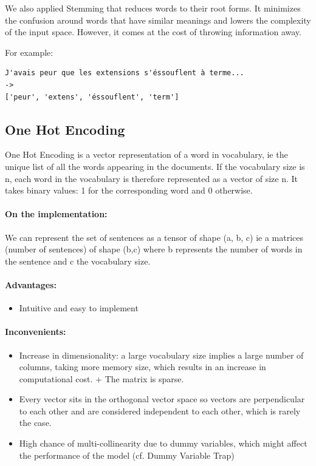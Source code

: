 \documentclass{article}
\begin{document}
We also applied Stemming that reduces words to their root forms. It minimizes the confusion around words that have similar meanings and lowers the complexity of the input space. However, it comes at the cost of throwing information away.

For example:
\begin{verbatim}
J'avais peur que les extensions s'éssouflent à terme...
->
['peur', 'extens', 'éssouflent', 'term']
\end{verbatim}

\subsection{One Hot Encoding}

One Hot Encoding is a vector representation of a word in vocabulary, ie the unique list of all the words appearing in the documents.
If the vocabulary size is n, each word in the vocabulary is therefore represented as a vector of size n. It takes binary values: 1 for the corresponding word and 0 otherwise.

\paragraph{On the implementation:}

We can represent the set of sentences as a tensor of shape (a, b, c) ie a matrices (number of sentences) of shape (b,c) where b represents the number of words in the sentence and c the vocabulary size.

\paragraph{Advantages:}

\begin{itemize}
  \item Intuitive and easy to implement
\end{itemize}

\paragraph{Inconvenients:}

\begin{itemize}
  \item Increase in dimensionality: a large vocabulary size implies a large number of columns, taking more memory size, which results in an increase in computational cost. + The matrix is sparse.
  \item Every vector sits in the orthogonal vector space so vectors are perpendicular to each other and are considered independent to each other, which is rarely the case.
  \item High chance of multi-collinearity due to dummy variables, which might affect the performance of the model (cf. Dummy Variable Trap)
\end{itemize}
\end{document}
